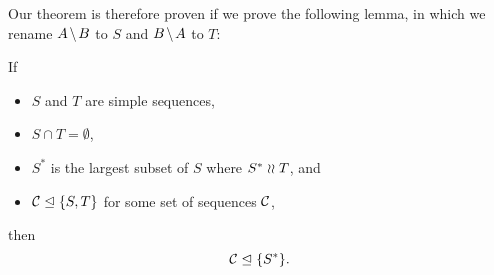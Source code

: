 Our theorem is therefore proven if we prove the following lemma,
in which we rename $\ambnp$ to $S$ and $\bmanp$ to $T$:
\newcommand{\condSimple}{(c1)}
\newcommand{\condDisj}{(c2)}
\newcommand{\condApr}{(c3)}
\newcommand{\condWork}{(c4)}
\begin{mylem}\label{reconciliation_correct_part}
If
   \begin{itemize}
   \item[\condSimple] $S$ and $T$ are simple sequences,
   \item[\condDisj] $S\cap T=\emptyset$,
   \item[\condApr] $S^*$ is the largest subset of $S$ where $S^*\mathrel{\wr\wr} T$, and
   \item[\condWork] ${\mathcal{C}}\trianglelefteq{\{{S,T}\}}$ for some set of sequences $\mathcal{C}$,
   \end{itemize}
then
\[ {\mathcal{C}}\trianglelefteq{\{{S^*}\}}. \]
\end{mylem}

